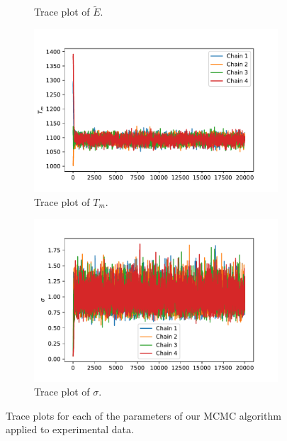 \begin{figure}[h!]
\begin{subfigure}{.5\textwidth}
  \caption{Trace plot of $\tilde{E}$.}
  \label{fig:1EXPE}
\end{subfigure}
\newline
\begin{subfigure}{.5\textwidth}
  \centering
  \includegraphics[width=\linewidth]{figures/bayesian/1_reaction/EXP/trace_plot_Tm.pdf}
  \caption{Trace plot of $T_m$.}
  \label{fig:1EXPTm}
\end{subfigure}%
\begin{subfigure}{.5\textwidth}
  \centering
  \includegraphics[width=\linewidth]{figures/bayesian/1_reaction/EXP/trace_plot_sigma.pdf}
  \caption{Trace plot of $\sigma$.}
  \label{fig:1EXPsigma}
\end{subfigure}
    \caption{Trace plots for each of the parameters of our MCMC algorithm applied to experimental data.}%
    \label{fig:EXPtrace}%
\end{figure}%


